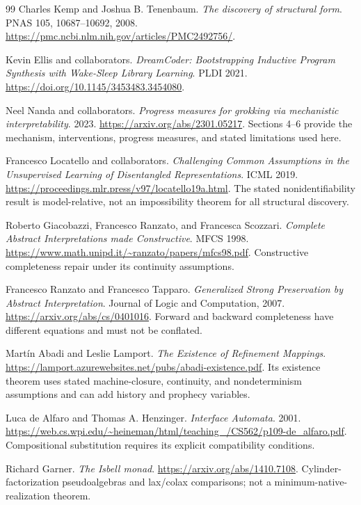 \documentclass[11pt]{article}
\theoremstyle{remark}
\begin{document}
\begin{thebibliography}{99}
Charles Kemp and Joshua B. Tenenbaum.
\emph{The discovery of structural form}. PNAS 105, 10687--10692, 2008.
\url{https://pmc.ncbi.nlm.nih.gov/articles/PMC2492756/}.

Kevin Ellis and collaborators.
\emph{DreamCoder: Bootstrapping Inductive Program Synthesis with Wake-Sleep Library Learning}. PLDI 2021.
\url{https://doi.org/10.1145/3453483.3454080}.

Neel Nanda and collaborators. \emph{Progress measures for grokking via mechanistic interpretability}. 2023.
\url{https://arxiv.org/abs/2301.05217}.
Sections 4--6 provide the mechanism, interventions, progress measures, and stated limitations used here.

Francesco Locatello and collaborators.
\emph{Challenging Common Assumptions in the Unsupervised Learning of Disentangled Representations}. ICML 2019.
\url{https://proceedings.mlr.press/v97/locatello19a.html}.
The stated nonidentifiability result is model-relative, not an impossibility theorem for all structural discovery.

Roberto Giacobazzi, Francesco Ranzato, and Francesca Scozzari.
\emph{Complete Abstract Interpretations made Constructive}. MFCS 1998.
\url{https://www.math.unipd.it/~ranzato/papers/mfcs98.pdf}.
Constructive completeness repair under its continuity assumptions.

Francesco Ranzato and Francesco Tapparo.
\emph{Generalized Strong Preservation by Abstract Interpretation}.
Journal of Logic and Computation, 2007.
\url{https://arxiv.org/abs/cs/0401016}.
Forward and backward completeness have different equations and must not be conflated.

Mart\'in Abadi and Leslie Lamport.
\emph{The Existence of Refinement Mappings}.
\url{https://lamport.azurewebsites.net/pubs/abadi-existence.pdf}.
Its existence theorem uses stated machine-closure, continuity, and nondeterminism assumptions and can add history and prophecy variables.

Luca de Alfaro and Thomas A. Henzinger.
\emph{Interface Automata}. 2001.
\url{https://web.cs.wpi.edu/~heineman/html/teaching_/CS562/p109-de_alfaro.pdf}.
Compositional substitution requires its explicit compatibility conditions.

Richard Garner. \emph{The Isbell monad}.
\url{https://arxiv.org/abs/1410.7108}.
Cylinder-factorization pseudoalgebras and lax/colax comparisons; not a minimum-native-realization theorem.


\end{thebibliography}
\end{document}
